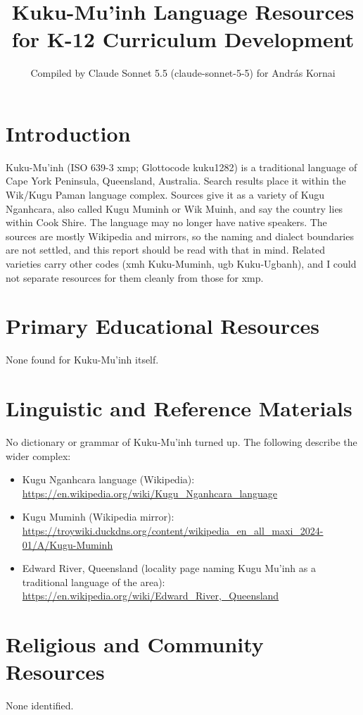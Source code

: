 \documentclass[12pt]{article}
\title{Kuku-Mu'inh Language Resources for K-12 Curriculum Development}
\author{Compiled by Claude Sonnet 5.5 (claude-sonnet-5-5) for Andr\'as Kornai}
\date{}
\begin{document}
\maketitle

\section{Introduction}
Kuku-Mu'inh (ISO 639-3 xmp; Glottocode kuku1282) is a traditional language of Cape York Peninsula, Queensland, Australia. Search results place it within the Wik/Kugu Paman language complex. Sources give it as a variety of Kugu Nganhcara, also called Kugu Muminh or Wik Muinh, and say the country lies within Cook Shire. The language may no longer have native speakers. The sources are mostly Wikipedia and mirrors, so the naming and dialect boundaries are not settled, and this report should be read with that in mind. Related varieties carry other codes (xmh Kuku-Muminh, ugb Kuku-Ugbanh), and I could not separate resources for them cleanly from those for xmp.

\section{Primary Educational Resources}
None found for Kuku-Mu'inh itself.

\section{Linguistic and Reference Materials}
No dictionary or grammar of Kuku-Mu'inh turned up. The following describe the wider complex:
\begin{itemize}
\item Kugu Nganhcara language (Wikipedia): \url{https://en.wikipedia.org/wiki/Kugu_Nganhcara_language}
\item Kugu Muminh (Wikipedia mirror): \url{https://troywiki.duckdns.org/content/wikipedia_en_all_maxi_2024-01/A/Kugu-Muminh}
\item Edward River, Queensland (locality page naming Kugu Mu'inh as a traditional language of the area): \url{https://en.wikipedia.org/wiki/Edward_River,_Queensland}
\end{itemize}

\section{Religious and Community Resources}
None identified.
\end{document}
